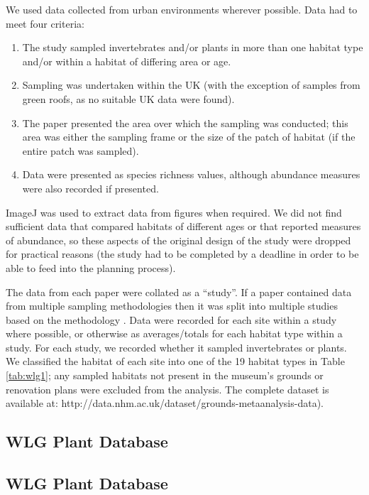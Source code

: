 We used data collected from urban environments wherever possible. Data had to meet four criteria:
\begin{enumerate}
\item The study sampled invertebrates and/or plants in more than one habitat type and/or within a habitat of differing area or age.
\item Sampling was undertaken within the UK (with the exception of samples from green roofs, as no suitable UK data were found).
\item The paper presented the area over which the sampling was conducted; this area was either the sampling frame or the size of the patch of habitat (if the entire patch was sampled). 
\item Data were presented as species richness values, although abundance measures were also recorded if presented.
\end{enumerate}
ImageJ \citep{schindelin:2012fiji} was used to extract data from figures when required. We did not find sufficient data that compared habitats of different ages or that reported measures of abundance, so these aspects of the original design of the study were dropped for practical reasons (the study had to be completed by a deadline in order to be able to feed into the planning process).

The data from each paper were collated as a ``study''. If a paper contained data from multiple sampling methodologies then it was split into multiple studies based on the methodology \citep[following][]{Hudson:2014predicts}. Data were recorded for each site within a study where possible, or otherwise as averages/totals for each habitat type within a study. For each study, we recorded whether it sampled invertebrates or plants. We classified the habitat of each site into one of the 19 habitat types in Table \ref{tab:wlg1}; any sampled habitats not present in the museum's grounds or renovation plans were excluded from the analysis. The complete dataset is available at: http://data.nhm.ac.uk/dataset/grounds-metaanalysis-data).

\ifappendixStyle %
\subsection{WLG Plant Database}%
\else
\subsection*{WLG Plant Database}
\fi

